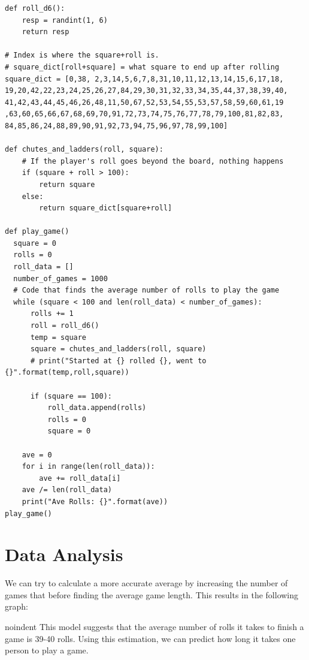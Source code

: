 \documentclass[12pt]{article} %
\begin{document}
\begin{verbatim}
def roll_d6():
    resp = randint(1, 6)
    return resp

# Index is where the square+roll is.
# square_dict[roll+square] = what square to end up after rolling
square_dict = [0,38, 2,3,14,5,6,7,8,31,10,11,12,13,14,15,6,17,18,
19,20,42,22,23,24,25,26,27,84,29,30,31,32,33,34,35,44,37,38,39,40,
41,42,43,44,45,46,26,48,11,50,67,52,53,54,55,53,57,58,59,60,61,19
,63,60,65,66,67,68,69,70,91,72,73,74,75,76,77,78,79,100,81,82,83,
84,85,86,24,88,89,90,91,92,73,94,75,96,97,78,99,100]

def chutes_and_ladders(roll, square):
    # If the player's roll goes beyond the board, nothing happens
    if (square + roll > 100):
        return square
    else:
        return square_dict[square+roll]

def play_game()
  square = 0
  rolls = 0
  roll_data = []
  number_of_games = 1000
  # Code that finds the average number of rolls to play the game
  while (square < 100 and len(roll_data) < number_of_games):
      rolls += 1
      roll = roll_d6()
      temp = square
      square = chutes_and_ladders(roll, square)
      # print("Started at {} rolled {}, went to {}".format(temp,roll,square))

      if (square == 100):
          roll_data.append(rolls)
          rolls = 0
          square = 0

    ave = 0
    for i in range(len(roll_data)):
        ave += roll_data[i]
    ave /= len(roll_data)
    print("Ave Rolls: {}".format(ave))
play_game()

\end{verbatim}

\section*{Data Analysis}
We can try to calculate a more accurate average by increasing the number of games that before finding the average game length. This results in the following graph:


noindent
This model suggests that the average number of rolls it takes to finish a game is 39-40 rolls. Using this estimation, we can predict how long it takes one person to play a game.
\end{document}
